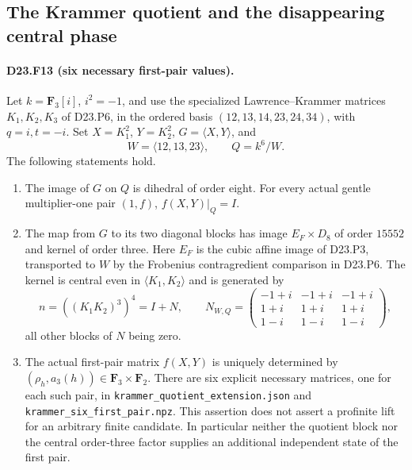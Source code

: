 \subsection{The Krammer quotient and the disappearing central phase}

\paragraph{D23.F13 (six necessary first-pair values).}
Let $k=\mathbf F_3[i]$, $i^2=-1$, and use the specialized
Lawrence--Krammer matrices $K_1,K_2,K_3$ of D23.P6, in the
ordered basis $(12,13,14,23,24,34)$, with $q=i,t=-i$.
Set $X=K_1^2$, $Y=K_2^2$, $G=\langle X,Y\rangle$, and
\[
 W=\langle12,13,23\rangle,\qquad Q=k^6/W.
\]
The following statements hold.
\begin{enumerate}
\item The image of $G$ on $Q$ is dihedral of order eight.
For every actual gentle multiplier-one pair $(1,f)$,
$f(X,Y)|_Q=I$.
\item The map from $G$ to its two diagonal blocks has image
$E_F\times D_8$ of order $15552$ and kernel of order three.
Here $E_F$ is the cubic affine image of D23.P3, transported
to $W$ by the Frobenius contragredient comparison in D23.P6.
The kernel is central even in $\langle K_1,K_2\rangle$ and is
generated by
\[
 n=((K_1K_2)^3)^4=I+N,
 \qquad
 N_{W,Q}=\begin{pmatrix}
 -1+i&-1+i&-1+i\\
 1+i&1+i&1+i\\
 1-i&1-i&1-i
 \end{pmatrix},
\tag{D23.F13.1}
\]
all other blocks of $N$ being zero.
\item The actual first-pair matrix $f(X,Y)$ is uniquely
determined by $(\rho_h,a_3(h))\in\mathbf F_3\times\mathbf F_2$.
There are six explicit necessary matrices, one for each such
pair, in \texttt{krammer\_quotient\_extension.json} and
\texttt{krammer\_six\_first\_pair.npz}.  This assertion does
not assert a profinite lift for an arbitrary finite candidate.
In particular neither the quotient block nor the central
order-three factor supplies an additional independent state
of the first pair.
\end{enumerate}

